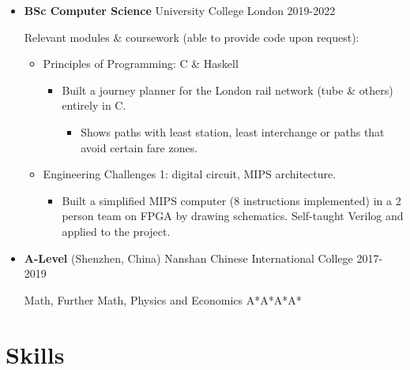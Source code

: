   \begin{itemize}
    \def\ongoing{%
    }
    \item \ongoing{} \textbf{BSc Computer Science} \dashdiv{} University College London \dashdiv{} 2019-2022

      Relevant modules \& coursework (able to provide code upon request):

      \begin{itemize}

        \item Principles of Programming: C \& Haskell

        \begin{itemize}
          \item Built a journey planner for the\tflicon{} London rail network (tube \& others) entirely in C.

          \begin{itemize}
            \item Shows paths with least station, least interchange or paths that avoid certain fare zones.
          \end{itemize}
        \end{itemize}

        \item Engineering Challenges 1: digital circuit, MIPS architecture.

        \begin{itemize}
          \item Built a simplified MIPS computer (8 instructions implemented) in a 2 person team on FPGA by drawing schematics. Self-taught Verilog and applied to the project.
        \end{itemize}

      \end{itemize}

    \item \textbf{A-Level} \dashdiv{} (Shenzhen, China) Nanshan Chinese International College \dashdiv{} 2017-2019

      Math, Further Math, Physics and Economics \dashdiv{} A*A*A*A*
  \end{itemize}

  \section{Skills}


